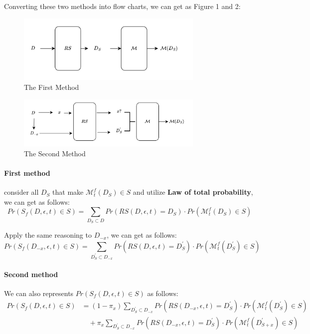\documentclass[a4paper,12pt]{article}
\begin{document}
Converting these two methods into flow charts, we can get as Figure 1 and 2:
\begin{figure}[ht]
    \centering
    \includegraphics[width=0.8\textwidth]{assets/1.png}
    \caption{The First Method}
\end{figure}
\begin{figure}[ht]
    \centering
    \includegraphics[width=0.8\textwidth]{assets/2.png}
    \caption{The Second Method}
\end{figure}
\newpage
\paragraph{First method}
consider all $D_S$ that make $\mathcal{M}_{t}^{f}(D_S) \in S$ and utilize \textbf{Law of total probability}, we can get as follows:
\begin{equation}
    Pr(S_f(D, \epsilon, t) \in S) = \sum_{D_S \subset D}Pr(RS(D, \epsilon, t) = D_S) \cdot Pr(\mathcal{M}_{t}^{f}(D_S) \in S)
\end{equation}

Apply the same reasoning to $D_{-x}$, we can get as follows:
\begin{equation}
    Pr(S_f(D_{-x}, \epsilon, t) \in S) = \sum_{D_{S}^{'} \subset D_{-x}}Pr(RS(D, \epsilon, t) = D_{S}^{'}) \cdot Pr(\mathcal{M}_{t}^{f}(D_{S}^{'}) \in S)
\end{equation}

\paragraph{Second method}
We can also represents $Pr(S_f(D, \epsilon, t) \in S)$ as follows:
\begin{equation}
    \begin{aligned}
        Pr(S_f(D, \epsilon, t) \in S) & = (1 - \pi_x)\sum_{D_{S}^{'} \subset D_{-x}}Pr(RS(D_{-x}, \epsilon, t) = D_S^{'}) \cdot Pr(\mathcal{M}_{t}^{f}(D_{S}^{'}) \in S)      \\
                                      & \quad + \pi_x\sum_{D_{S}^{'} \subset D_{-x}}Pr(RS(D_{-x}, \epsilon, t) = D_{S}^{'}) \cdot Pr(\mathcal{M}_{t}^{f}(D_{S+ x}^{'}) \in S) \\
    \end{aligned}
\end{equation}
\end{document}
